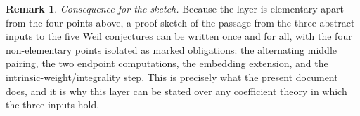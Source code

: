 \documentclass[11pt]{article}
\theoremstyle{plain}
\theoremstyle{definition}
\newtheorem{remark}[theorem]{Remark}
\begin{document}
\begin{remark}
\emph{Consequence for the sketch.}  Because the layer is elementary apart from
the four points above, a proof sketch of the passage from the three abstract
inputs to the five Weil conjectures can be written once and for all, with the
four non-elementary points isolated as marked obligations: the alternating
middle pairing, the two endpoint computations, the embedding extension, and
the intrinsic-weight/integrality step.  This is precisely what the present
document does, and it is why this layer can be stated over any coefficient
theory in which the three inputs hold.
\end{remark}
\endgroup
\end{document}
